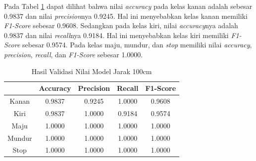 Pada Tabel \ref{tb:Hasil Validasi Nilai Model Jarak 100cm} dapat dilihat bahwa nilai \emph{accuracy} pada kelas kanan adalah sebesar 0.9837 dan nilai \emph{precision}nya 0.9245. Hal ini menyebabkan kelas kanan memiliki \emph{F1-Score} sebesar 0.9608. Sedangkan pada kelas kiri, nilai \emph{accuracy}nya adalah 0.9837 dan nilai \emph{recall}nya 0.9184. Hal ini menyebabkan kelas kiri memiliki \emph{F1-Score} sebesar 0.9574. Pada kelas maju, mundur, dan \emph{stop} memiliki nilai \emph{accuracy}, \emph{precision}, \emph{recall}, dan \emph{F1-Score} sebesar 1.0000. 

\begin{table}[H]
  \centering
  \caption{Hasil Validasi Nilai Model Jarak 100cm}
  \label{tb:Hasil Validasi Nilai Model Jarak 100cm}
  \begin{tabular}{|c|c|c|c|c|}
    \hline
    \rowcolor[HTML]{C0C0C0} 
    \cellcolor[HTML]{C0C0C0} & Accuracy & Precision & Recall & F1-Score \\ \hline
    Kanan                    & 0.9837   & 0.9245    & 1.0000 & 0.9608   \\ \hline
    Kiri                     & 0.9837   & 1.0000    & 0.9184 & 0.9574   \\ \hline
    Maju                     & 1.0000   & 1.0000    & 1.0000 & 1.0000   \\ \hline
    Mundur                   & 1.0000   & 1.0000    & 1.0000 & 1.0000   \\ \hline
    Stop                     & 1.0000   & 1.0000    & 1.0000 & 1.0000   \\ \hline
    \end{tabular}
    \end{table}




